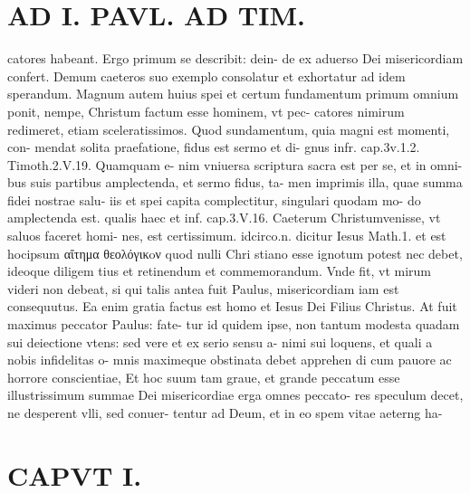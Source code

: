 \documentclass{article}
\begin{document}
\begin{pages}
\section*{AD I. PAVL. AD TIM. }
\marginpar{[ p.28. ]}\pstart catores habeant. Ergo primum se describit: dein- de ex aduerso Dei misericordiam confert. Demum caeteros suo exemplo consolatur et exhortatur ad idem sperandum. Magnum autem huius spei et certum fundamentum primum omnium ponit, nempe, Christum factum esse hominem, vt pec- catores nimirum redimeret, etiam sceleratissimos. Quod sundamentum, quia magni est momenti, con- mendat solita praefatione, fidus est sermo et di- gnus infr. cap.3v.1.2. Timoth.2.V.19. Quamquam e- nim vniuersa scriptura sacra est per se, et in omni- bus suis partibus amplectenda, et sermo fidus, ta- men imprimis illa, quae summa fidei nostrae salu- iis et spei capita complectitur, singulari quodam mo- do amplectenda est. qualis haec et inf. cap.3.V.16. Caeterum Christumvenisse, vt saluos faceret homi- nes, est certissimum. idcirco.n. dicitur Iesus Math.1. et est hocipsum αἴτημα θεολόγικoν quod nulli Chri stiano esse ignotum potest nec debet, ideoque diligem tius et retinendum et commemorandum. Vnde fit, vt mirum videri non debeat, si qui talis antea fuit Paulus, misericordiam iam est consequutus. Ea enim gratia factus est homo et Iesus Dei Filius Christus. At fuit maximus peccator Paulus: fate- tur id quidem ipse, non tantum modesta quadam sui deiectione vtens: sed vere et ex serio sensu a- nimi sui loquens, et quali a nobis infidelitas o- mnis maximeque obstinata debet apprehen di cum pauore ac horrore conscientiae, Et hoc suum tam graue, et grande peccatum esse illustrissimum summae Dei misericordiae erga omnes peccato- res speculum decet, ne desperent vlli, sed conuer- tentur ad Deum, et in eo spem vitae aeterng ha-  \pend
\section*{CAPVT  I. }
\marginpar{[ p.29 ]}\pstart {}
{}

\end{pages}
\end{document}
